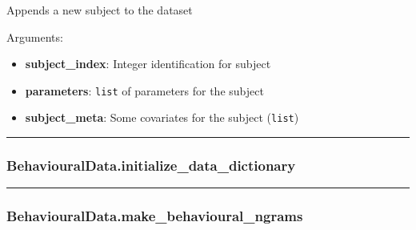 \begin{Shaded}
\begin{Highlighting}[]
\end{Highlighting}
\end{Shaded}

Appends a new subject to the dataset

Arguments:

\begin{itemize}
\tightlist
\item
  \textbf{subject\_index}: Integer identification for subject
\item
  \textbf{parameters}: \texttt{list} of parameters for the subject
\item
  \textbf{subject\_meta}: Some covariates for the subject
  (\texttt{list})
\end{itemize}

\begin{center}\rule{0.5\linewidth}{\linethickness}\end{center}

\hypertarget{behaviouraldata.initialize_data_dictionary}{%
\subsubsection{BehaviouralData.initialize\_data\_dictionary}\label{behaviouraldata.initialize_data_dictionary}}

\begin{Shaded}
\begin{Highlighting}[]
\NormalTok{)}
\end{Highlighting}
\end{Shaded}

\begin{center}\rule{0.5\linewidth}{\linethickness}\end{center}

\hypertarget{behaviouraldata.make_behavioural_ngrams}{%
\subsubsection{BehaviouralData.make\_behavioural\_ngrams}\label{behaviouraldata.make_behavioural_ngrams}}

\begin{Shaded}
\begin{Highlighting}[]
\end{Highlighting}
\end{Shaded}

